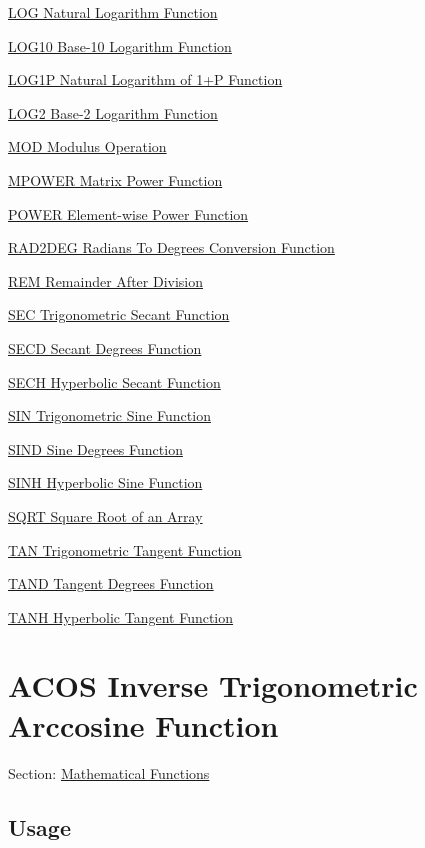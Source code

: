 \begin{DoxyItemize}
\item \hyperlink{mathfunctions_log}{L\-O\-G Natural Logarithm Function}  
\item \hyperlink{mathfunctions_log10}{L\-O\-G10 Base-\/10 Logarithm Function}  
\item \hyperlink{mathfunctions_log1p}{L\-O\-G1\-P Natural Logarithm of 1+\-P Function}  
\item \hyperlink{mathfunctions_log2}{L\-O\-G2 Base-\/2 Logarithm Function}  
\item \hyperlink{mathfunctions_mod}{M\-O\-D Modulus Operation}  
\item \hyperlink{mathfunctions_mpower}{M\-P\-O\-W\-E\-R Matrix Power Function}  
\item \hyperlink{mathfunctions_power}{P\-O\-W\-E\-R Element-\/wise Power Function}  
\item \hyperlink{mathfunctions_rad2deg}{R\-A\-D2\-D\-E\-G Radians To Degrees Conversion Function}  
\item \hyperlink{mathfunctions_rem}{R\-E\-M Remainder After Division}  
\item \hyperlink{mathfunctions_sec}{S\-E\-C Trigonometric Secant Function}  
\item \hyperlink{mathfunctions_secd}{S\-E\-C\-D Secant Degrees Function}  
\item \hyperlink{mathfunctions_sech}{S\-E\-C\-H Hyperbolic Secant Function}  
\item \hyperlink{mathfunctions_sin}{S\-I\-N Trigonometric Sine Function}  
\item \hyperlink{mathfunctions_sind}{S\-I\-N\-D Sine Degrees Function}  
\item \hyperlink{mathfunctions_sinh}{S\-I\-N\-H Hyperbolic Sine Function}  
\item \hyperlink{mathfunctions_sqrt}{S\-Q\-R\-T Square Root of an Array}  
\item \hyperlink{mathfunctions_tan}{T\-A\-N Trigonometric Tangent Function}  
\item \hyperlink{mathfunctions_tand}{T\-A\-N\-D Tangent Degrees Function}  
\item \hyperlink{mathfunctions_tanh}{T\-A\-N\-H Hyperbolic Tangent Function}  
\end{DoxyItemize}\hypertarget{mathfunctions_acos}{}\section{A\-C\-O\-S Inverse Trigonometric Arccosine Function}\label{mathfunctions_acos}
Section\-: \hyperlink{sec_mathfunctions}{Mathematical Functions} \hypertarget{vtkwidgets_vtkxyplotwidget_Usage}{}\subsection{Usage}\label{vtkwidgets_vtkxyplotwidget_Usage}
